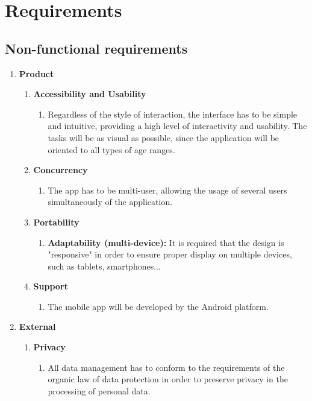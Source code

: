 \documentclass[11pt,a4paper]{article}
\begin{document}
\newpage
\section{Requirements}
\subsection{Non-functional requirements}
\begin{enumerate}
\item \textbf{Product}
	\begin{enumerate}
	
	\item \textbf{Accessibility and Usability}
		\begin{enumerate}
		\item Regardless of the style of interaction, the interface has to be simple and intuitive, providing a high level of interactivity and usability. The tasks will be as visual as possible, since the application will be oriented to all types of age ranges. 
		\end{enumerate}
	\item \textbf{Concurrency}
		\begin{enumerate}
		\item  The app has to be multi-user, allowing the usage of several users simultaneously of the application.
		\end{enumerate}
		
	\item \textbf{Portability}
		\begin{enumerate}
		\item \textbf{Adaptability (multi-device):} It is required that the design is "responsive" in order to ensure proper display on multiple devices, such as tablets, smartphones...
		\end{enumerate}
		
	\item \textbf{Support}
		\begin{enumerate}
		\item The mobile app will be developed by the Android platform.
		\end{enumerate}
	\end{enumerate}

\item \textbf{External}
	\begin{enumerate}
	\item \textbf{Privacy} 
		\begin{enumerate}
		\item All data management has to conform to the requirements of the organic law of data protection in order to preserve privacy in the processing of personal data.
		\end{enumerate}
		
	\end{enumerate}

\end{enumerate}
\end{document}
